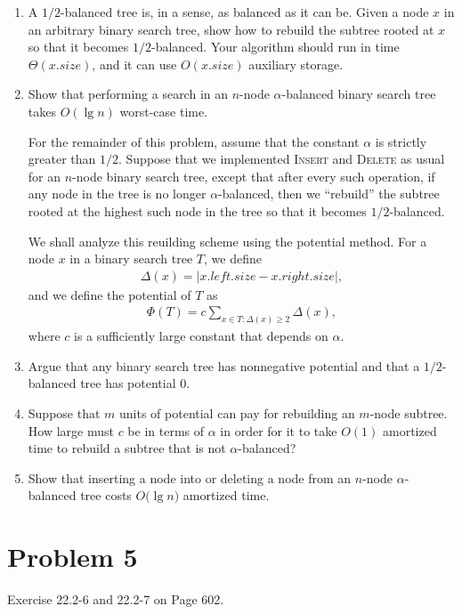 \documentclass{../../class}
\begin{document}
\begin{enumerate}
    \item A $1/2$-balanced tree is, in a sense, as balanced as it can be. Given a node $x$ in an arbitrary binary search tree, show how to rebuild the subtree rooted at $x$ so that it becomes $1/2$-balanced. Your algorithm should run in time $\Theta (x.size)$, and it can use $O(x.size)$ auxiliary storage.
    \item Show that performing a search in an $n$-node $\alpha$-balanced binary search tree takes $O(\lg{n})$ worst-case time.

    For the remainder of this problem, assume that the constant $\alpha$ is strictly greater than $1/2$. Suppose that we implemented \textsc{Insert} and \textsc{Delete} as usual for an $n$-node binary search tree, except that after every such operation, if any node in the tree is no longer $\alpha$-balanced, then we \enquote{rebuild} the subtree rooted at the highest such node in the tree so that it becomes $1/2$-balanced.

    We shall analyze this reuilding scheme using the potential method. For a node $x$ in a binary search tree $T$, we define
    \begin{gather*}
        \Delta(x) = |x.left.size - x.right.size|,
    \end{gather*}
    and we define the potential of $T$ as
    \begin{gather*}
        \Phi(T) = c \sum_{x\in T: \Delta(x) \geq 2} \Delta(x), 
    \end{gather*}
    where $c$ is a sufficiently large constant that depends on $\alpha$.
    \item Argue that any binary search tree has nonnegative potential and that a $1/2$-balanced tree has potential $0$.
    \item Suppose that $m$ units of potential can pay for rebuilding an $m$-node subtree. How large must $c$ be in terms of $\alpha$ in order for it to take $O(1)$ amortized time to rebuild a subtree that is not $\alpha$-balanced?
    \item Show that inserting a node into or deleting a node from an $n$-node $\alpha$-balanced tree costs $O(\lg{n)}$ amortized time.
\end{enumerate}

\newpage
\section*{Problem 5}
\begin{tcolorbox}
    Exercise 22.2-6 and 22.2-7 on Page 602.
\end{tcolorbox}
\end{document}

